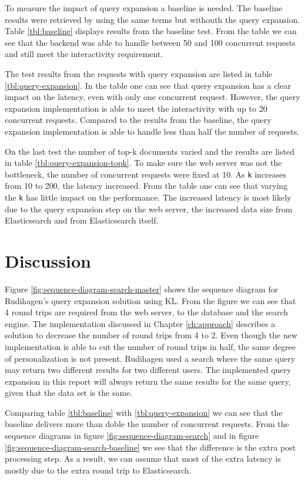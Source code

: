 To measure the impact of query expansion a baseline is needed.
The baseline results were retrieved by using the same terms but withouth the query expansion.
Table \ref{tbl:baseline} displays results from the baseline test.
From the table we can see that the backend was able to handle between 50 and 100 concurrent requests and still meet the interactivity requirement.

The test results from the requests with query expansion are listed in table \ref{tbl:query-expansion}.
In the table one can see that query expansion has a clear impact on the latency, even with only one concurrent request.
However, the query expansion implementation is able to meet the interactivity with up to 20 concurrent requests.
Compared to the results from the baseline,
the query expansion implementation is able to handle less than half the number of requests.

On the last test the number of top-k documents varied and the results are listed in table \ref{tbl:query-expansion-topk}.
To make sure the web server was not the bottleneck, the number of concurrent requests were fixed at 10.
As \texttt{k} increases from 10 to 200, the latency increased.
From the table one can see that varying the \texttt{k} has little impact on the performance.
The increased latency is most likely due to the query expansion step on the web server,
the increased data size from Elasticsearch and from Elasticsearch itself.



\section{Discussion}
Figure \ref{fig:sequence-diagram-search-master} shows the sequence diagram for Rudihagen's query expansion solution using KL.
From the figure we can see that 4 round trips are required from the web server, to the database and the search engine.
The implementation discussed in Chapter \ref{ch:approach} describes a solution to decrease the number of round trips from 4 to 2.
Even though the new implementation is able to cut the number of round trips in half, the same degree of personalization is not present.
Rudihagen used a search where the same query may return two different results for two different users.
The implemented query expansion in this report will always return the same results for the same query, given that the data set is the same.

Comparing table \ref{tbl:baseline} with \ref{tbl:query-expansion} we can see that the baseline delivers more than doble the number of concurrent requests.
From the sequence diagrams in figure \ref{fig:sequence-diagram-search} and in figure \ref{fig:sequence-diagram-search-baseline} we see that the difference is the extra post processing step.
As a result, we can assume that most of the extra latency is mostly due to the extra round trip to Elasticsearch.

